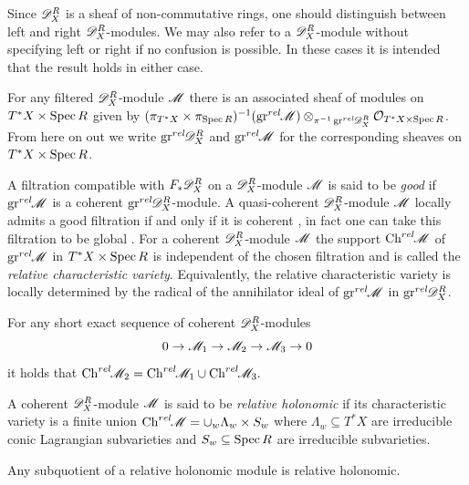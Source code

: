 Since $\mathscr{D}_X^R$ is a sheaf of non-commutative rings, one should distinguish between left and right $\mathscr{D}_X^R$-modules.
We may also refer to a $\mathscr{D}_X^R$-module without specifying left or right if no confusion is possible. In these cases it is intended that the result holds in either case.

For any filtered $\mathscr{D}_X^R$-module $\mathscr{M}$ there is an associated sheaf of modules on $T^*X\times \operatorname{Spec} R$ given by
$(\pi_{T^*X}\times \pi_{\operatorname{Spec} R})^{-1}(\operatorname{gr}^{rel}\mkern-5mu\mathscr{M})\allowbreak\otimes_{\pi^{-1}\operatorname{gr}^{rel}\mkern-5mu\mathscr{D}_X^R} \mathcal{O}_{T^*X\times \operatorname{Spec} R}$.
From here on out we write $\operatorname{gr}^{rel}\mkern-5mu\mathscr{D}_X^R$ and $\operatorname{gr}^{rel}\mkern-5mu \mathscr{M}$ for the corresponding sheaves on $T^*X\times \operatorname{Spec} R$.

A filtration compatible with $F_* \mathscr{D}_X^R$ on a $\mathscr{D}_X^R$-module $\mathscr{M}$ is said to be {\it good} if $\operatorname{gr}^{rel}\mkern-5mu\mathscr{M}$ is a coherent $\operatorname{gr}^{rel}\mkern-5mu\mathscr{D}_X^R$-module.
A quasi-coherent $\mathscr{D}_X^R$-module $\mathscr{M}$ locally admits a good filtration if and only if it is coherent \cite[Corollary D.1.2]{hotta2007d}, in fact one can take this filtration to be global \cite[Proof of Theorem 2.1.3]{hotta2007d}.
For a coherent $\mathscr{D}_X^R$-module $\mathscr{M}$ the support $\operatorname{Ch}^{rel}\mkern-5mu\mathscr{M}$ of $\operatorname{gr}^{rel}\mkern-5mu\mathscr{M}$ in $T^*X\times \operatorname{Spec} R$ is independent of the chosen filtration \cite[Lemma D.3.1.]{hotta2007d} and is called the {\it relative characteristic variety}.
Equivalently, the relative characteristic variety is locally determined by the radical of the annihilator ideal of $\operatorname{gr}^{rel}\mkern-5mu \mathscr{M}$ in $\operatorname{gr}^{rel}\mkern-5mu\mathscr{D}_X^R$.
\begin{proposition}{\cite[Lemma 3.2.2]{budur2020zeroI}}\label{prop: SESBehaviourChrel}
  For any short exact sequence of coherent $\mathscr{D}_X^R$-modules
  $$0\to \mathscr{M}_1\to \mathscr{M}_2 \to \mathscr{M}_3 \to 0 $$
  it holds that $\operatorname{Ch}^{rel}\mkern-5mu\mathscr{M}_2 = \operatorname{Ch}^{rel}\mkern-5mu\mathscr{M}_1 \cup \operatorname{Ch}^{rel}\mkern-5mu\mathscr{M}_3.$
\end{proposition}
\begin{definition}\label{def: RelHolonomic}
  A coherent $\mathscr{D}_X^R$-module $\mathscr{M}$ is said to be {\it relative holonomic} if its characteristic variety is a finite union $\operatorname{Ch}^{rel}\mkern-5mu\mathscr{M} = \cup_w \Lambda_w \times S_w$ where $\Lambda_w\subseteq T^* X$ are irreducible conic Lagrangian subvarieties and $S_w\subseteq \operatorname{Spec} R$ are irreducible subvarieties.
\end{definition}

\begin{proposition}{\cite[Lemma 3.2.4]{budur2020zeroI}}\label{prop: SubquotientRelHol}
  Any subquotient of a relative holonomic module is relative holonomic.
\end{proposition}

